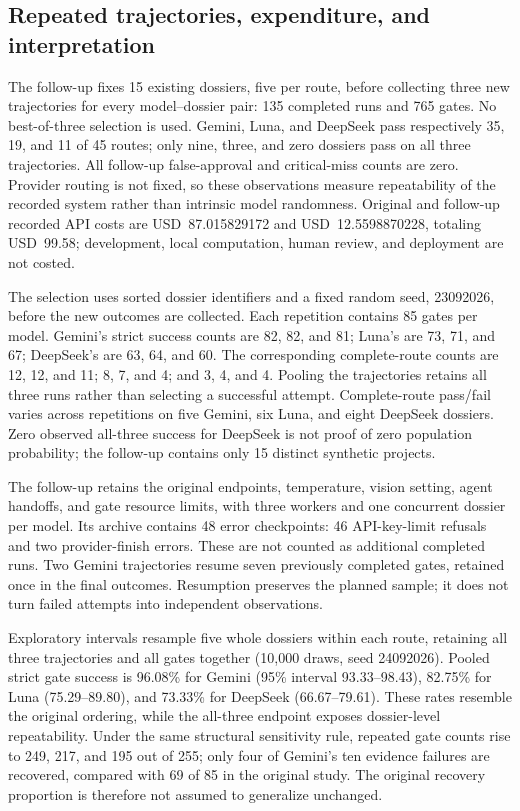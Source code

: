 \subsection{Repeated trajectories, expenditure, and interpretation}
The follow-up fixes 15 existing dossiers, five per route, before collecting three new
trajectories for every model--dossier pair: 135 completed runs and 765 gates. No best-of-three
selection is used. Gemini, Luna, and DeepSeek pass respectively 35, 19, and 11 of 45 routes;
only nine, three, and zero dossiers pass on all three trajectories. All follow-up false-approval
and critical-miss counts are zero. Provider routing is not fixed, so these observations measure
repeatability of the recorded system rather than intrinsic model randomness. Original and
follow-up recorded API costs are USD~87.015829172 and USD~12.5598870228, totaling USD~99.58;
development, local computation, human review, and deployment are not costed.

The selection uses sorted dossier identifiers and a fixed random seed, 23092026, before the
new outcomes are collected. Each repetition contains 85 gates per model. Gemini's strict
success counts are 82, 82, and 81; Luna's are 73, 71, and 67; DeepSeek's are 63, 64, and 60.
The corresponding complete-route counts are 12, 12, and 11; 8, 7, and 4; and 3, 4, and 4.
Pooling the trajectories retains all three runs rather than selecting a successful attempt.
Complete-route pass/fail varies across repetitions on five Gemini, six Luna, and eight DeepSeek
dossiers. Zero observed all-three success for DeepSeek is not proof of zero population
probability; the follow-up contains only 15 distinct synthetic projects.

The follow-up retains the original endpoints, temperature, vision setting, agent handoffs,
and gate resource limits, with three workers and one concurrent dossier per model. Its archive
contains 48 error checkpoints: 46 API-key-limit refusals and two provider-finish errors. These
are not counted as additional completed runs. Two Gemini trajectories resume seven previously
completed gates, retained once in the final outcomes. Resumption preserves the planned sample;
it does not turn failed attempts into independent observations.

Exploratory intervals resample five whole dossiers within each route, retaining all three
trajectories and all gates together (10,000 draws, seed 24092026). Pooled strict gate success
is 96.08\% for Gemini (95\% interval 93.33--98.43), 82.75\% for Luna (75.29--89.80), and
73.33\% for DeepSeek (66.67--79.61). These rates resemble the original ordering, while the
all-three endpoint exposes dossier-level repeatability. Under the same structural sensitivity
rule, repeated gate counts rise to 249, 217, and 195 out of 255; only four of Gemini's ten
evidence failures are recovered, compared with 69 of 85 in the original study. The original
recovery proportion is therefore not assumed to generalize unchanged.

